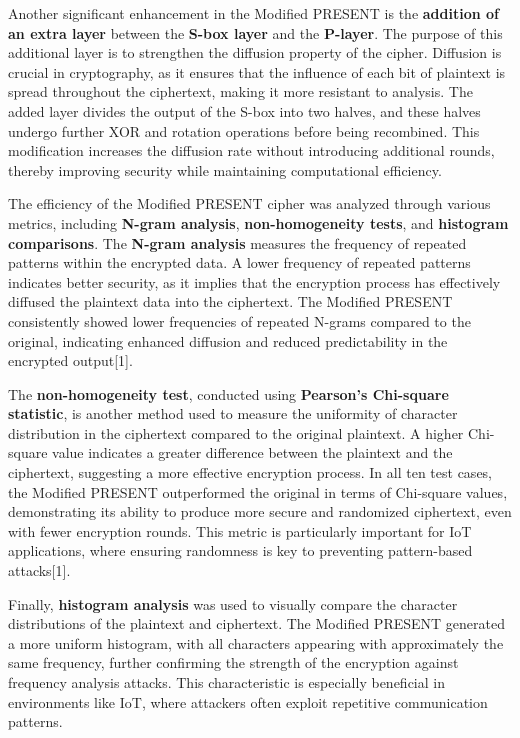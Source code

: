 \documentclass{article}
\begin{document}
Another significant enhancement in the Modified PRESENT is the \textbf{addition of an extra layer} between the \textbf{S-box layer} and the \textbf{P-layer}. The purpose of this additional layer is to strengthen the diffusion property of the cipher. Diffusion is crucial in cryptography, as it ensures that the influence of each bit of plaintext is spread throughout the ciphertext, making it more resistant to analysis. The added layer divides the output of the S-box into two halves, and these halves undergo further XOR and rotation operations before being recombined. This modification increases the diffusion rate without introducing additional rounds, thereby improving security while maintaining computational efficiency.

The efficiency of the Modified PRESENT cipher was analyzed through various metrics, including \textbf{N-gram analysis}, \textbf{non-homogeneity tests}, and \textbf{histogram comparisons}. The \textbf{N-gram analysis} measures the frequency of repeated patterns within the encrypted data. A lower frequency of repeated patterns indicates better security, as it implies that the encryption process has effectively diffused the plaintext data into the ciphertext. The Modified PRESENT consistently showed lower frequencies of repeated N-grams compared to the original, indicating enhanced diffusion and reduced predictability in the encrypted output[1].

The \textbf{non-homogeneity test}, conducted using \textbf{Pearson’s Chi-square statistic}, is another method used to measure the uniformity of character distribution in the ciphertext compared to the original plaintext. A higher Chi-square value indicates a greater difference between the plaintext and the ciphertext, suggesting a more effective encryption process. In all ten test cases, the Modified PRESENT outperformed the original in terms of Chi-square values, demonstrating its ability to produce more secure and randomized ciphertext, even with fewer encryption rounds. This metric is particularly important for IoT applications, where ensuring randomness is key to preventing pattern-based attacks[1].

Finally, \textbf{histogram analysis} was used to visually compare the character distributions of the plaintext and ciphertext. The Modified PRESENT generated a more uniform histogram, with all characters appearing with approximately the same frequency, further confirming the strength of the encryption against frequency analysis attacks. This characteristic is especially beneficial in environments like IoT, where attackers often exploit repetitive communication patterns.
\end{document}
